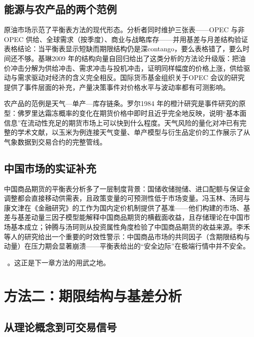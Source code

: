\documentclass[12pt,a4paper]{ctexart}
\begin{document}
\subsection{能源与农产品的两个范例}

原油市场示范了平衡表方法的现代形态。分析者同时维护三张表——OPEC 与非OPEC 供给、全球需求（按季度）、商业与战略库存——并用基差与月差结构验证表格结论：当平衡表显示短缺而期限结构仍是深contango，要么表格错了，要么时间还不够。基琳2009 年的结构向量自回归给出了这类分析的方法论升级版：把油价冲击分解为供给冲击、需求冲击与投机冲击，证明同样幅度的价格上涨，供给驱动与需求驱动对经济的含义完全相反\cite{17}。国际货币基金组织关于OPEC 会议的研究提供了事件层面的补充，产量决策事件对价格水平与波动率都有可测影响\cite{52}。

农产品的范例是天气—单产—库存链条。罗尔1984 年的橙汁研究是事件研究的原型：佛罗里达霜冻概率的变化在期货价格中即时且近乎完全地反映，说明“基本面信息”在流动性充足的期货市场上可以快到什么程度\cite{18}。天气风险的量化对冲已有完整的学术文献，以玉米为例连接天气变量、单产模型与衍生品定价的工作展示了从气象数据到交易合约的完整管线\cite{99}。

\subsection{中国市场的实证补充}

中国商品期货的平衡表分析多了一层制度背景：国储收储抛储、进口配额与保证金调整都会直接移动供需表，且政策变量的可预测性低于市场变量。冯玉林、汤珂与康文津在《金融研究》的工作为国内定价机制提供了基准——他们构建的市场、基差与基差动量三因子模型能解释中国商品期货的横截面收益，且存储理论在中国市场基本成立\cite{87}；钟腾与汤珂则从投资属性角度检验了中国商品期货的收益来源\cite{88}。李禾等人的研究给出一个重要的时效性警示：中国商品市场的共同因子（含期限结构与动量）在压力期会显著崩溃\cite{89}——平衡表给出的“安全边际”在极端行情中并不安全。

\
。这正是下一章方法的用武之地。

\section{方法二：期限结构与基差分析}

\subsection{从理论概念到可交易信号}
\end{document}
